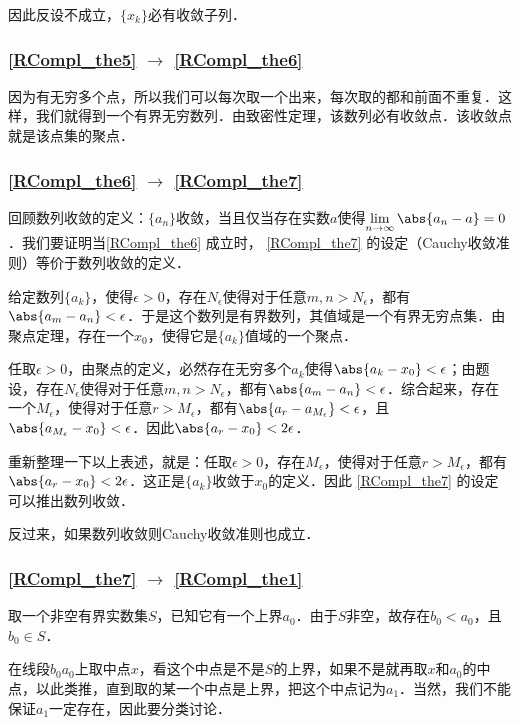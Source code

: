 因此反设不成立，$\{x_k\}$必有收敛子列．

\subsubsection{\autoref{RCompl_the5} $\to$ \autoref{RCompl_the6} }

因为有无穷多个点，所以我们可以每次取一个出来，每次取的都和前面不重复．这样，我们就得到一个有界无穷数列．由致密性定理，该数列必有收敛点．该收敛点就是该点集的聚点．



\subsubsection{\autoref{RCompl_the6} $\to$ \autoref{RCompl_the7} }

回顾数列收敛的定义：$\{a_n\}$收敛，当且仅当存在实数$a$使得$\lim\limits_{n\to \infty}\abs{a_n-a}=0$．我们要证明当\autoref{RCompl_the6} 成立时， \autoref{RCompl_the7} 的设定（Cauchy收敛准则）等价于数列收敛的定义．

给定数列$\{a_k\}$，使得$\epsilon>0$，存在$N_\epsilon$使得对于任意$m, n>N_\epsilon$，都有$\abs{a_m-a_n}<\epsilon$．于是这个数列是有界数列，其值域是一个有界无穷点集．由聚点定理，存在一个$x_0$，使得它是$\{a_k\}$值域的一个聚点．

任取$\epsilon>0$，由聚点的定义，必然存在无穷多个$a_k$使得$\abs{a_k-x_0}<\epsilon$；由题设，存在$N_\epsilon$使得对于任意$m, n>N_\epsilon$，都有$\abs{a_m-a_n}<\epsilon$．综合起来，存在一个$M_\epsilon$，使得对于任意$r>M_\epsilon$，都有$\abs{a_r-a_{M_\epsilon}}<\epsilon$，且$\abs{a_{M_\epsilon}-x_0}<\epsilon$．因此$\abs{a_r-x_0}<2\epsilon$．

重新整理一下以上表述，就是：任取$\epsilon>0$，存在$M_\epsilon$，使得对于任意$r>M_\epsilon$，都有$\abs{a_r-x_0}<2\epsilon$．这正是$\{a_k\}$收敛于$x_0$的定义．因此 \autoref{RCompl_the7} 的设定可以推出数列收敛．

反过来，如果数列收敛则Cauchy收敛准则也成立．


\subsubsection{\autoref{RCompl_the7} $\to$ \autoref{RCompl_the1} }

取一个非空有界实数集$S$，已知它有一个上界$a_0$．由于$S$非空，故存在$b_0<a_0$，且$b_0\in S$．

在线段$b_0a_0$上取中点$x$，看这个中点是不是$S$的上界，如果不是就再取$x$和$a_0$的中点，以此类推，直到取的某一个中点是上界，把这个中点记为$a_1$．当然，我们不能保证$a_1$一定存在，因此要分类讨论．

